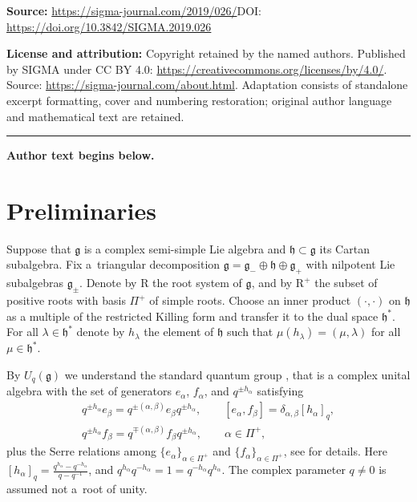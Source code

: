 \documentclass[11pt]{article}
\numberwithin{equation}{section}
\begin{document}
\noindent\textbf{Source:} \url{https://sigma-journal.com/2019/026/}\quad DOI: \url{https://doi.org/10.3842/SIGMA.2019.026}\par
\noindent\textbf{License and attribution:} Copyright retained by the named authors. Published by SIGMA under CC BY 4.0: \url{https://creativecommons.org/licenses/by/4.0/}. Source: \url{https://sigma-journal.com/about.html}. Adaptation consists of standalone excerpt formatting, cover and numbering restoration; original author language and mathematical text are retained.\par
\medskip\hrule\medskip\noindent\textbf{Author text begins below.}\par
\setcounter{section}{1}
\setcounter{subsection}{0}
\setcounter{subsubsection}{0}
\setcounter{Theorem}{0}
\setcounter{equation}{0}
\section{Preliminaries}\label{SecPrelim}
Suppose that $\mathfrak{g}$ is a complex semi-simple Lie algebra and $\mathfrak{h}\subset \mathfrak{g}$ its Cartan subalgebra. Fix a~triangular decomposition $\mathfrak{g}=\mathfrak{g}_-\oplus \mathfrak{h}\oplus \mathfrak{g}_+$ with nilpotent Lie subalgebras $\mathfrak{g}_\pm$. Denote by $\mathrm{R}$ the root system of $\mathfrak{g}$, and by $\mathrm{R}^+$ the subset of positive roots with basis $\Pi^+$ of simple roots. Choose an inner product $(\cdot,\cdot)$ on $\mathfrak{h}$ as a multiple of the restricted Killing form and transfer it to the dual space $\mathfrak{h}^*$. For all $\lambda\in \mathfrak{h}^*$ denote by $h_\lambda$ the element of $\mathfrak{h}$ such that $\mu(h_\lambda)=(\mu,\lambda)$ for all $\mu\in \mathfrak{h}^*$.

By $U_q(\mathfrak{g})$ we understand the standard quantum group \cite{ChP, D3}, that is a complex unital algebra with the set of generators $e_\alpha$, $f_\alpha$, and $q^{\pm h_\alpha}$ satisfying
\begin{gather*}
q^{\pm h_\alpha}e_\beta=q^{\pm (\alpha,\beta)}e_\beta q^{\pm h_\alpha}, \qquad [e_\alpha,f_\beta]=\delta_{\alpha,\beta}[h_\alpha]_q,\\
q^{\pm h_\alpha}f_\beta=q^{\mp (\alpha,\beta)}f_\beta q^{\pm h_\alpha},\qquad \alpha \in \Pi^+,
\end{gather*}
plus the Serre relations among $\{e_\alpha\}_{\alpha\in \Pi^+}$ and $\{f_\alpha\}_{\alpha\in \Pi^+}$, see \cite{ChP} for details. Here $[h_\alpha]_q=\frac{q^{h_\alpha}-q^{-h_\alpha}}{q-q^{-1}}$, and $q^{h_\alpha}q^{-h_\alpha}=1=q^{-h_\alpha}q^{h_\alpha}$. The complex parameter $q\not =0$ is assumed not a~root of unity.
\end{document}

